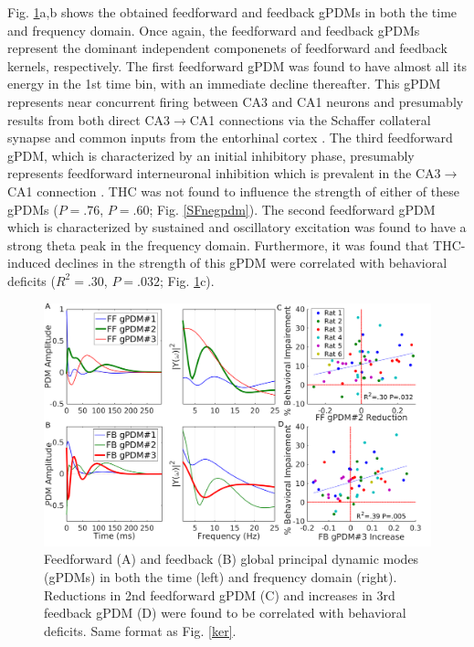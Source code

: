 \documentclass[11pt,a4paper,final]{article}
\begin{document}
Fig. \ref{pdm}a,b shows the obtained feedforward and feedback gPDMs in both the time and frequency domain.
Once again, the feedforward and feedback gPDMs represent the dominant independent componenets of feedforward and feedback kernels, respectively.
The first feedforward gPDM was found to have almost all its energy in the 1st time bin, with an immediate decline thereafter.
This gPDM represents near concurrent firing between CA3 and CA1 neurons and presumably results from both direct CA3$\to$CA1 connections via the Schaffer collateral synapse \citep{deadwyler75,sandler15clpp} and common inputs from the entorhinal cortex \citep{jones93,mehta09}.
The third feedforward gPDM, which is characterized by an initial inhibitory phase, presumably represents feedforward interneuronal inhibition which is prevalent in the CA3$\to$CA1 connection \citep{pouille01,zemankovics13}.
THC was not found to influence the strength of either of these gPDMs ($P=.76$, $P=.60$; Fig. \ref{SFnegpdm}).
The second feedforward gPDM which is characterized by sustained and oscillatory excitation was found to have a strong theta peak in the frequency domain.
Furthermore, it was found that THC-induced declines in the strength of this gPDM were correlated with behavioral deficits ($R^2=.30$, $P=.032$; Fig. \ref{pdm}c).

\begin{figure}[!ht]
\centering
\includegraphics[width=130mm]{pdm}
\caption[PDM Analysis]{
Feedforward (A) and feedback (B) global principal dynamic modes (gPDMs) in both the time (left) and frequency domain (right).
Reductions in 2nd feedforward gPDM (C) and increases in 3rd feedback gPDM (D) were found to be correlated with behavioral deficits. Same format as Fig. \ref{ker}.}
\label{pdm}
\end{figure}
\end{document}

